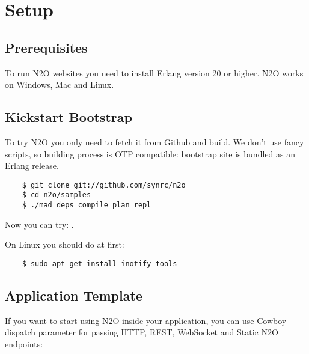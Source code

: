 \section{Setup}

\subsection{Prerequisites}
To run N2O websites you need to install Erlang version 20 or higher.
N2O works on Windows, Mac and Linux.

\subsection{Kickstart Bootstrap}
To try N2O you only need to fetch it from Github and build. We don't use
fancy scripts, so building process is OTP compatible: bootstrap site
is bundled as an Erlang release.

\vspace{1\baselineskip}
\begin{lstlisting}
    $ git clone git://github.com/synrc/n2o
    $ cd n2o/samples
    $ ./mad deps compile plan repl
\end{lstlisting}
\vspace{1\baselineskip}

Now you can try: .

On Linux you should do at first:

\vspace{1\baselineskip}
\begin{lstlisting}
    $ sudo apt-get install inotify-tools
\end{lstlisting}
\vspace{1\baselineskip}

\newpage
\subsection{Application Template}
If you want to start using N2O inside your application, you can use Cowboy dispatch parameter
for passing HTTP, REST, WebSocket and Static N2O endpoints:

